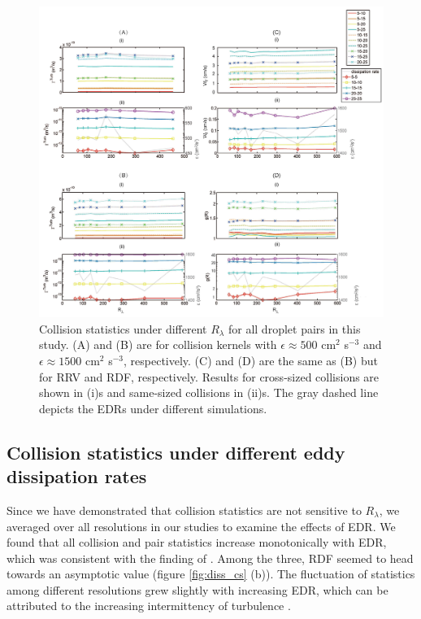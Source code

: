 \begin{figure}[ht]
\centering
\includegraphics[width=\textwidth]{Figures/Chap2/re_cs.jpg}
\caption{ Collision statistics under different  $R_\lambda$ for all droplet pairs in this study. (A) and (B) are for collision kernels with $\epsilon \approx500$ cm$^2$ s$^{-3}$ and $\epsilon \approx1500$ cm$^2$ s$^{-3}$, respectively.  (C) and (D) are the same as (B) but for RRV and RDF, respectively. Results for cross-sized collisions are shown in (i)s and same-sized collisions in (ii)s. The gray dashed line depicts the EDRs under different simulations.} \label{fig:re_cs}
\end{figure}

\subsection{Collision statistics under different eddy dissipation rates} \label{sec:ch2_diss}

Since we have demonstrated that collision statistics are not sensitive to $R_\lambda$, we averaged over all resolutions in our studies to examine the effects of EDR. We found that all collision and pair statistics increase monotonically with EDR, which was consistent with the finding of \citet{Ayala2008a}. Among the three, RDF seemed to head towards an asymptotic value (figure \ref{fig:diss_cs} (b)).  The fluctuation of statistics among different resolutions grew slightly with increasing EDR, which can be attributed to the increasing intermittency of turbulence \citep[e.g. ][]{Pope2000}. 


